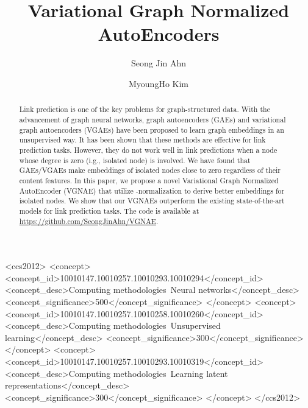\documentclass[sigconf]{acmart}
\begin{document}
\title{Variational Graph Normalized AutoEncoders}

\author{Seong Jin Ahn}

\author{MyoungHo Kim}


\renewcommand{\shortauthors}{Short Paper Track}

\begin{abstract}
Link prediction is one of the key problems for graph-structured data.
With the advancement of graph neural networks, graph autoencoders (GAEs) and variational graph autoencoders (VGAEs) have been proposed to learn graph embeddings in an unsupervised way.
It has been shown that these methods are effective for link prediction tasks.
However, they do not work well in link predictions when a node whose degree is zero (i.g., isolated node) is involved.
We have found that GAEs/VGAEs make embeddings of isolated nodes close to zero regardless of their content features.
In this paper, we propose a novel Variational Graph Normalized AutoEncoder (VGNAE) that utilize -normalization to derive better embeddings for isolated nodes.
We show that our VGNAEs outperform the existing state-of-the-art models for link prediction tasks.
The code is available at \hyperlink{https://github.com/SeongJinAhn/VGNAE}{https://github.com/SeongJinAhn/VGNAE}.
\end{abstract}



\begin{CCSXML}
<ccs2012>
   <concept>
       <concept_id>10010147.10010257.10010293.10010294</concept_id>
       <concept_desc>Computing methodologies~Neural networks</concept_desc>
       <concept_significance>500</concept_significance>
       </concept>
   <concept>
       <concept_id>10010147.10010257.10010258.10010260</concept_id>
       <concept_desc>Computing methodologies~Unsupervised learning</concept_desc>
       <concept_significance>300</concept_significance>
       </concept>
   <concept>
       <concept_id>10010147.10010257.10010293.10010319</concept_id>
       <concept_desc>Computing methodologies~Learning latent representations</concept_desc>
       <concept_significance>300</concept_significance>
       </concept>
 </ccs2012>
\end{CCSXML}

\end{document}
